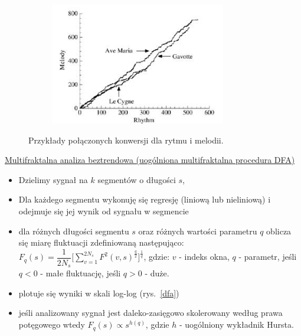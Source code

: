 \begin{figure} [H]
	\centering
	\begin{subfigure}{.8\textwidth}
		\centering
		\includegraphics[width=1.0\linewidth]{EDMIIssues/Figures/stairs.png}
	\end{subfigure}
	\caption{Przykłady połączonych konwersji dla rytmu i melodii.}
	\label{stairs}
\end{figure} 

\underline{Multifraktalna analiza beztrendowa (uogólniona multifraktalna procedura DFA)}

\begin{itemize}
	\item Dzielimy sygnał na $ k $ segmentów o długości $ s $,
	\item Dla każdego segmentu wykonuję się regresję (liniową lub nieliniową) i odejmuje się jej wynik od sygnału w segmencie
	\item dla różnych długości segmentu $ s $ oraz różnych wartości parametru $ q $ oblicza się miarę fluktuacji zdefiniowaną następująco:\newline
	$ F_q(s) = \dfrac{1}{2N_s} \bigg[\sum\limits_{v=1}^{2N_s} F^2(v, s)^{\frac{q}{2}} \bigg]^{\frac{1}{q}} $, gdzie:\newline
	$ v $ - indeks okna,\newline
	$ q $ - parametr, jeśli $ q < 0 $ - małe fluktuację, jeśli $ q > 0 $ - duże.
	\item plotuje się wyniki w skali log-log (rys.~\ref{dfa})
	\item jeśli analizowany sygnał jest daleko-zasięgowo skolerowany według prawa potęgowego wtedy $ F_q(s) \propto s^{h(q)} $, gdzie $ h $ - uogólniony wykładnik Hursta.
\end{itemize}

